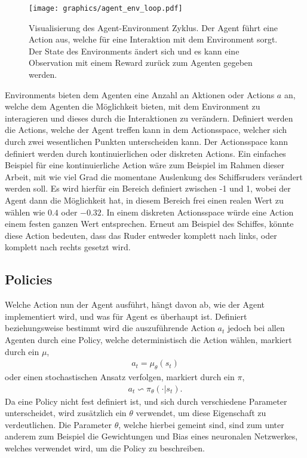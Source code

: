 \documentclass[]{iat}
\begin{document}
\begin{figure}[H]
    \texttt{[image: graphics/agent\_env\_loop.pdf]}
    \centering
    \caption{Visualisierung des Agent-Environment Zyklus. Der Agent führt eine Action aus, welche für eine Interaktion mit dem Environment sorgt. Der State des Environments ändert sich und es kann eine Observation mit einem Reward zurück zum Agenten gegeben werden.}
    \label{abb:agent_env_loop}
\end{figure}

Environments bieten dem Agenten eine Anzahl an Aktionen oder Actions $a$ an, welche dem Agenten die Möglichkeit bieten, mit dem Environment zu interagieren und dieses durch die Interaktionen zu verändern. Definiert werden die Actions, welche der Agent treffen kann in dem Actionsspace, welcher sich durch zwei wesentlichen Punkten unterscheiden kann. Der Actionsspace kann definiert werden durch kontinuierlichen oder diskreten Actions. Ein einfaches Beispiel für eine kontinuierliche Action wäre zum Beispiel im Rahmen dieser Arbeit, mit wie viel Grad die momentane Auslenkung des Schiffsruders verändert werden soll. Es wird hierfür ein Bereich definiert zwischen -1 und 1, wobei der Agent dann die Möglichkeit hat, in diesem Bereich frei einen realen Wert zu wählen wie $0.4$ oder $-0.32$. In einem diskreten Actionsspace würde eine Action einem festen ganzen Wert entsprechen. Erneut am Beispiel des Schiffes, könnte diese Action bedeuten, dass das Ruder entweder komplett nach links, oder komplett nach rechts gesetzt wird.

\subsection{Policies}
Welche Action nun der Agent ausführt, hängt davon ab, wie der Agent implementiert wird, und was für Agent es überhaupt ist. Definiert beziehungsweise bestimmt wird die auszuführende Action $a_t$ jedoch bei allen Agenten durch eine Policy, welche deterministisch die Action wählen, markiert durch ein $\mu$,
\begin{align}
    a_t = \mu_\theta(s_t)
\end{align}
oder einen stochastischen Ansatz verfolgen, markiert durch ein $\pi$,
\begin{align}
    a_t \backsim \pi_\theta (\cdot | s_t).
\end{align}
Da eine Policy nicht fest definiert ist, und sich durch verschiedene Parameter unterscheidet, wird zusätzlich ein $\theta$ verwendet, um diese Eigenschaft zu verdeutlichen. Die Parameter $\theta$, welche hierbei gemeint sind, sind zum unter anderem zum Beispiel die Gewichtungen und Bias eines neuronalen Netzwerkes, welches verwendet wird, um die Policy zu beschreiben.
\end{document}
